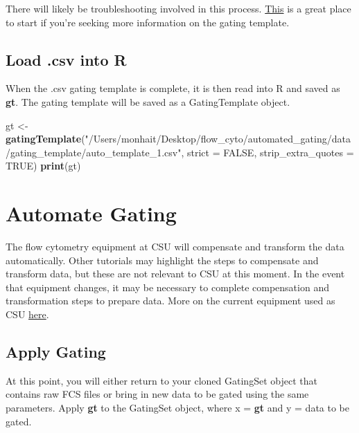 \documentclass[]{book}
\newenvironment{Shaded}{\begin{snugshade}}{\end{snugshade}}
\newcommand{\DataTypeTok}[1]{\textcolor[rgb]{0.13,0.29,0.53}{#1}}
\newcommand{\KeywordTok}[1]{\textcolor[rgb]{0.13,0.29,0.53}{\textbf{#1}}}
\newcommand{\NormalTok}[1]{#1}
\newcommand{\OtherTok}[1]{\textcolor[rgb]{0.56,0.35,0.01}{#1}}
\newcommand{\StringTok}[1]{\textcolor[rgb]{0.31,0.60,0.02}{#1}}
\begin{document}
There will likely be troubleshooting involved in this process. \href{https://www.bioconductor.org/packages/devel/bioc/vignettes/openCyto/inst/doc/HowToWriteCSVTemplate.html\#14_gating_method_that_generates_multiple_populations}{This} is a great place to start if you're seeking more information on the gating template.

\hypertarget{load-.csv-into-r}{%
\section{Load .csv into R}\label{load-.csv-into-r}}

When the .csv gating template is complete, it is then read into R and saved as \textbf{gt}. The gating template will be saved as a GatingTemplate object.

\begin{Shaded}
\begin{Highlighting}[]
\NormalTok{gt <-}\StringTok{ }\KeywordTok{gatingTemplate}\NormalTok{(}\StringTok{"/Users/monhait/Desktop/flow_cyto/automated_gating/data/gating_template/auto_template_1.csv"}\NormalTok{,}
                     \DataTypeTok{strict =} \OtherTok{FALSE}\NormalTok{, }\DataTypeTok{strip_extra_quotes =} \OtherTok{TRUE}\NormalTok{)}
\KeywordTok{print}\NormalTok{(gt)}
\end{Highlighting}
\end{Shaded}

\hypertarget{automate-gating}{%
\chapter{Automate Gating}\label{automate-gating}}

The flow cytometry equipment at CSU will compensate and transform the data automatically. Other tutorials may highlight the steps to compensate and transform data, but these are not relevant to CSU at this moment. In the event that equipment changes, it may be necessary to complete compensation and transformation steps to prepare data. More on the current equipment used as CSU \href{https://www.umassmed.edu/facslab/instrument/core-cytek-aurora2/}{here}.

\hypertarget{apply-gating}{%
\section{Apply Gating}\label{apply-gating}}

At this point, you will either return to your cloned GatingSet object that contains raw FCS files or bring in new data to be gated using the same parameters. Apply \textbf{gt} to the GatingSet object, where x = \textbf{gt} and y = data to be gated.
\end{document}

